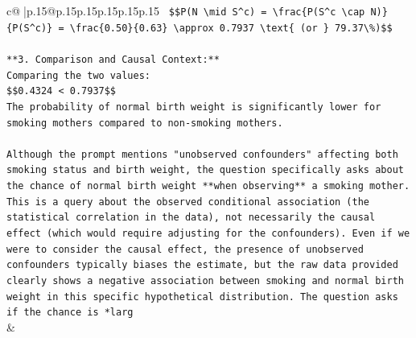 \documentclass{article}
\begin{document}
{\begin{supertabular}{c@{$\;$}|p{.15\linewidth}@{}p{.15\linewidth}p{.15\linewidth}p{.15\linewidth}p{.15\linewidth}p{.15\linewidth}}
{{{\texttt{    \$\$P(N \textbackslash{}mid S\^{}c) = \textbackslash{}frac\{P(S\^{}c \textbackslash{}cap N)\}\{P(S\^{}c)\} = \textbackslash{}frac\{0.50\}\{0.63\} \textbackslash{}approx 0.7937 \textbackslash{}text\{ (or \} 79.37\textbackslash{}\%)\$\$} \\
\\ 
\texttt{**3. Comparison and Causal Context:**} \\
\texttt{Comparing the two values:} \\
\texttt{\$\$0.4324 < 0.7937\$\$} \\
\texttt{The probability of normal birth weight is significantly lower for smoking mothers compared to non{-}smoking mothers.} \\
\\ 
\texttt{Although the prompt mentions "unobserved confounders" affecting both smoking status and birth weight, the question specifically asks about the chance of normal birth weight **when observing** a smoking mother. This is a query about the observed conditional association (the statistical correlation in the data), not necessarily the causal effect (which would require adjusting for the confounders). Even if we were to consider the causal effect, the presence of unobserved confounders typically biases the estimate, but the raw data provided clearly shows a negative association between smoking and normal birth weight in this specific hypothetical distribution. The question asks if the chance is *larg} \\
            }
        }
    }
    & \\ \\


\end{supertabular}}
\end{document}
